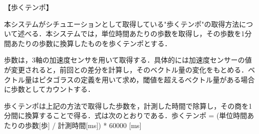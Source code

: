 【歩くテンポ】
\par
本システムがシチュエーションとして取得している"歩くテンポ"の取得方法について述べる．本システムでは，単位時間あたりの歩数を取得し，その歩数を1分間あたりの歩数に換算したものを歩くテンポとする．
\par
歩数は，3軸の加速度センサを用いて取得する．具体的には加速度センサーの値が変更されると，前回との差分を計算し，そのベクトル量の変化をもとめる．ベクトル量はピタゴラスの定義を用いて求め，閾値を超えるベクトル量がある場合に歩数としてカウントする．
\par
歩くテンポは上記の方法で取得した歩数を，計測した時間で除算し，その商を1分間に換算することで得る．式は次のとおりである．歩くテンポ = (単位時間あたりの歩数[歩] / 計測時間[ms]) * 60000 [ms]
